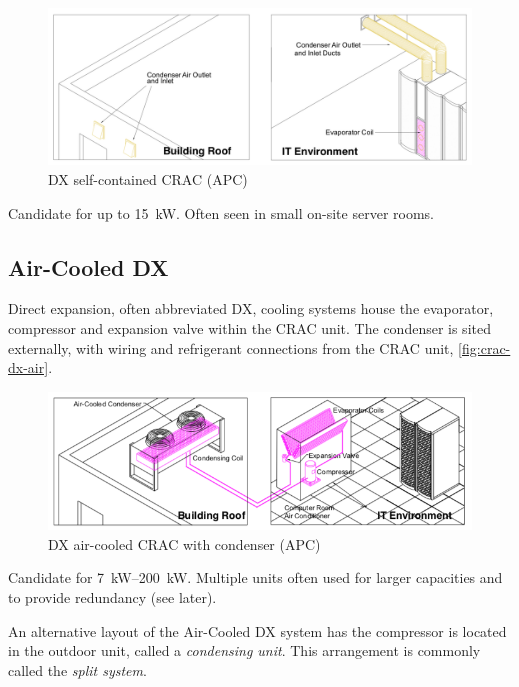 \documentclass{pgnotes}
\begin{document}
\begin{figure}[hptb]
  \centering
  \includegraphics[width=1.0\linewidth]{crac_self_contained_schematic}
  \caption{DX self-contained CRAC (APC)}
  \label{fig:crac-dx-self-contained}
\end{figure}

Candidate for up to \SI{15}{\kilo\watt}.
Often seen in small on-site server rooms.

\subsection{Air-Cooled DX}

Direct expansion, often abbreviated DX, cooling systems house the evaporator, compressor and expansion valve within the CRAC unit.
The condenser is sited externally, with wiring and refrigerant connections from the CRAC unit, \autoref{fig:crac-dx-air}.

\begin{figure}[hptb]
  \centering
  \includegraphics[width=1.0\linewidth]{crac_dx_air_schematic}
  \caption{DX air-cooled CRAC with condenser (APC)}
  \label{fig:crac-dx-air}
\end{figure}

Candidate for \SIrange{7}{200}{\kilo\watt}.
Multiple units often used for larger capacities and to provide redundancy (see later).


An alternative layout of the Air-Cooled DX system has the compressor is located in the outdoor unit, called a \textit{condensing unit}.
This arrangement is commonly called the \textit{split system}.
\end{document}
